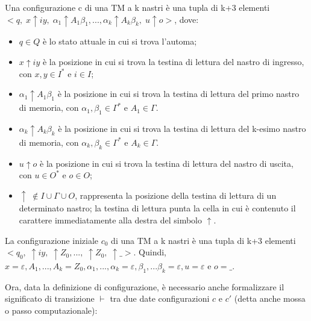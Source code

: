   \begin{definition} \label{configurazione TM}
    Una configurazione c di una TM a k nastri è una tupla di k+3 elementi \\    \(<q,\; x \!\uparrow\! iy,\; \alpha_1\!\uparrow\! A_1\beta_1,..., \alpha_k\!\uparrow\! A_k\beta_k,\; u\!\uparrow\! o>\), dove:
    \begin{itemize}
      \item \(q\in Q\) è lo stato attuale in cui si trova l'automa;
      \item \(x\!\uparrow\! iy\) è la posizione in cui si trova la testina di lettura del nastro di ingresso, con \(x,y \in I^*\) e \(i\in I\);
      \item \(\alpha_1\!\uparrow\! A_1\beta_1\) è la posizione in cui si trova la testina di lettura del primo nastro di memoria, con \(\alpha_1, \beta_1 \in \Gamma^*\) e \(A_1\in \Gamma\).
      \item \(\alpha_k\!\uparrow\! A_k\beta_k\) è la posizione in cui si trova la testina di lettura del k-esimo nastro di memoria, con \(\alpha_k, \beta_k \in \Gamma^*\) e \(A_k\in \Gamma\).
      \item \(u\!\uparrow\! o\) è la posizione in cui si trova la testina di lettura del nastro di uscita, con \(u\in O^*\) e \(o\in O\);
      \item \(\!\uparrow\! \; \notin I\cup \Gamma \cup O\), rappresenta la posizione della testina di lettura di un determinato nastro; la testina di lettura punta la cella in cui è contenuto il carattere immediatamente alla destra del simbolo \(\!\uparrow\!\).
    \end{itemize}
    La configurazione iniziale \(c_0\) di una TM a k nastri è una tupla di k+3 elementi \\ \(<q_0,\; \!\uparrow\! iy,\; \!\uparrow\! Z_0,...,\; \!\uparrow\! Z_0, \;\!\uparrow\! \_>\). Quindi, \(x=\varepsilon, A_1, ..., A_k=Z_0, \alpha_1,...,\alpha_k=\varepsilon, \beta_1, ...\beta_k=\varepsilon, u=\varepsilon\) e \(o=\_\).
  \end{definition}

  Ora, data la definizione di configurazione, è necessario anche formalizzare il significato di transizione \(\vdash\) tra due date configurazioni \(c\) e \(c'\) (detta anche mossa o passo computazionale):

